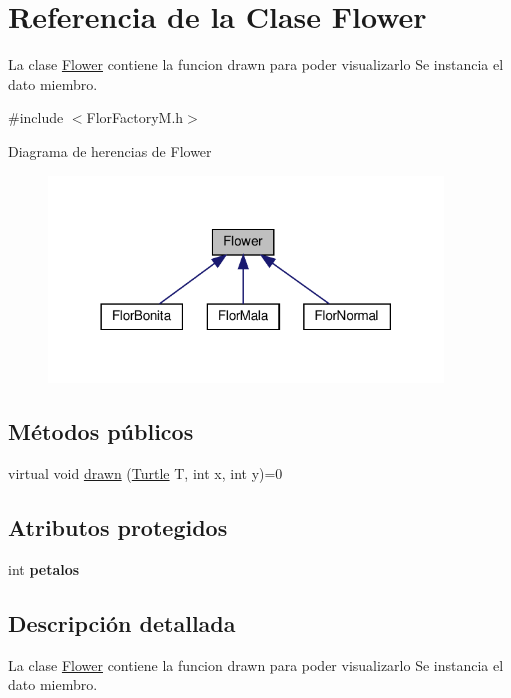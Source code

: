 \hypertarget{classFlower}{}\section{Referencia de la Clase Flower}
\label{classFlower}


La clase \hyperlink{classFlower}{Flower} contiene la funcion drawn para poder visualizarlo  Se instancia el dato miembro.  




{\ttfamily \#include $<$Flor\+Factory\+M.\+h$>$}



Diagrama de herencias de Flower\nopagebreak
\begin{figure}[H]
\begin{center}
\leavevmode
\includegraphics[width=297pt]{classFlower__inherit__graph}
\end{center}
\end{figure}
\subsection*{Métodos públicos}
\begin{DoxyCompactItemize}
\item 
virtual void \hyperlink{classFlower_af01eea570f9d02e16cda1d86ee97633c}{drawn} (\hyperlink{classTurtle}{Turtle} T, int x, int y)=0
\end{DoxyCompactItemize}
\subsection*{Atributos protegidos}
\begin{DoxyCompactItemize}
\item 
\mbox{\label{classFlower_a219dc895fadc1d1c8850d205cae4f9a2}} 
int {\bfseries petalos}
\end{DoxyCompactItemize}


\subsection{Descripción detallada}
La clase \hyperlink{classFlower}{Flower} contiene la funcion drawn para poder visualizarlo  Se instancia el dato miembro. 

